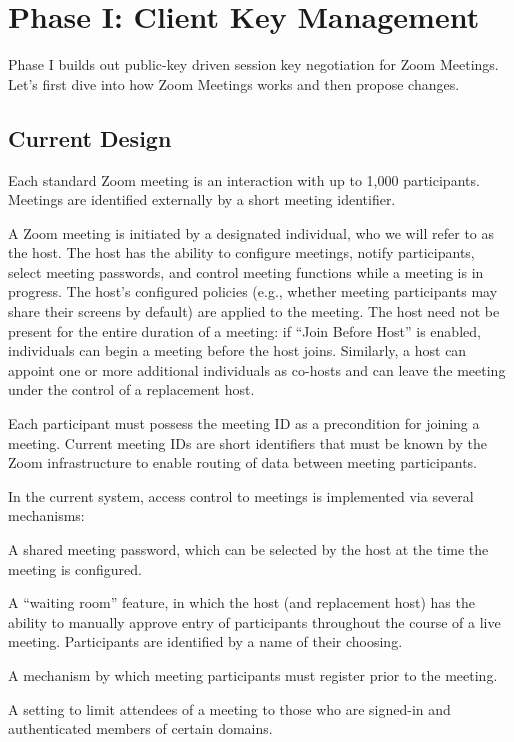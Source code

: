 \section{Phase I: Client Key Management}
Phase I builds out public-key driven session key negotiation for Zoom Meetings. Let's first dive into how Zoom Meetings works and then propose changes.
\subsection{Current Design}\label{subsec:currdesign}

Each standard Zoom meeting is an interaction with up to 1,000 participants. Meetings are identified externally by a short meeting identifier.

A Zoom meeting is initiated by a designated individual, who we will refer to as the host. The host has the ability to configure meetings, notify participants, select meeting passwords, and control meeting functions while a meeting is in progress. The host's configured policies (e.g., whether meeting participants may share their screens by default) are applied to the meeting. The host need not be present for the entire duration of a meeting: if ``Join Before Host'' is enabled, individuals can begin a meeting before the host joins. Similarly, a host can appoint one or more additional individuals as co-hosts and can leave the meeting under the control of a replacement host.

Each participant must possess the meeting ID as a precondition for joining a meeting. Current meeting IDs are short identifiers that must be known by the Zoom infrastructure to enable routing of data between meeting participants.

In the current system, access control to meetings is implemented via several mechanisms:

\begin{itemize*}
\item A shared meeting password, which can be selected by the host at the time the meeting is configured.
\item A ``waiting room'' feature, in which the host (and replacement host) has the ability to manually approve entry of participants throughout the course of a live meeting. Participants are identified by a name of their choosing.
\item A mechanism by which meeting participants must register prior to the meeting.
\item A setting to limit attendees of a meeting to those who are signed-in and authenticated members of certain domains.
\end{itemize*}


